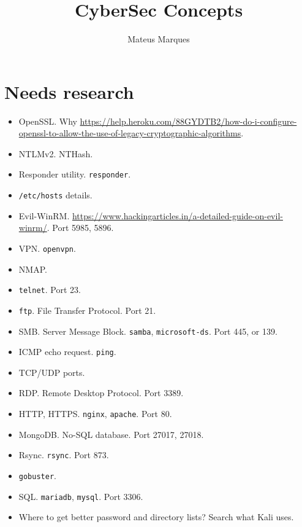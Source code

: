 \documentclass[a4paper,10pt]{article}
\title{\Huge{\textbf{CyberSec Concepts}}}
\author{Mateus Marques}
\begin{document}
\maketitle

\section{Needs research}

\begin{itemize}
\item OpenSSL. Why \url{https://help.heroku.com/88GYDTB2/how-do-i-configure-openssl-to-allow-the-use-of-legacy-cryptographic-algorithms}.

\item NTLMv2. NTHash.

\item Responder utility. \texttt{responder}.

\item \texttt{/etc/hosts} details.

\item Evil-WinRM. \url{https://www.hackingarticles.in/a-detailed-guide-on-evil-winrm/}. Port 5985, 5896.

\item VPN. \texttt{openvpn}.

\item NMAP.

\item \texttt{telnet}. Port 23.

\item \texttt{ftp}. File Transfer Protocol. Port 21.

\item SMB. Server Message Block. \texttt{samba}, \texttt{microsoft-ds}. Port 445, or 139.

\item ICMP echo request. \texttt{ping}.

\item TCP/UDP ports.

\item RDP. Remote Desktop Protocol. Port 3389.

\item HTTP, HTTPS. \texttt{nginx}, \texttt{apache}. Port 80.

\item MongoDB. No-SQL database. Port 27017, 27018.

\item Rsync. \texttt{rsync}. Port 873.

\item \texttt{gobuster}.

\item SQL. \texttt{mariadb}, \texttt{mysql}. Port 3306.

\item Where to get better password and directory lists? Search what Kali uses.
\end{itemize}
\end{document}
